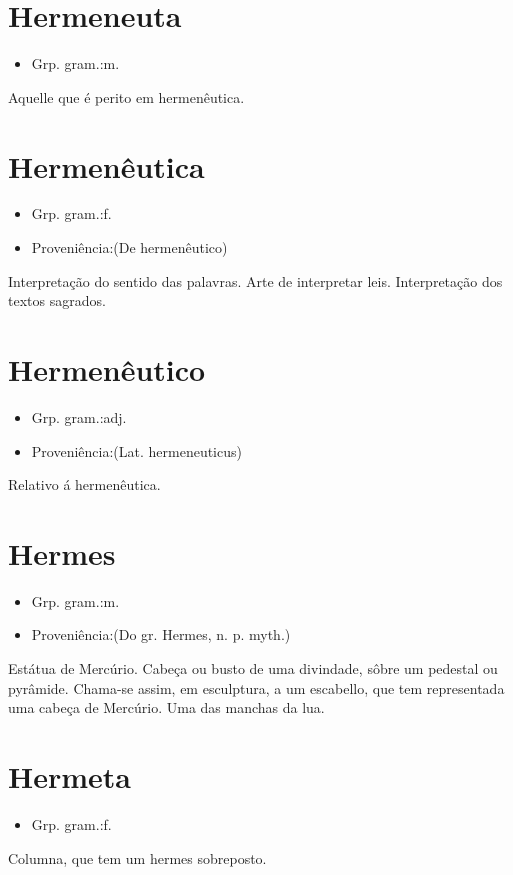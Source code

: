 \documentclass{article}
\begin{document}
\section{Hermeneuta}
\begin{itemize}
\item {Grp. gram.:m.}
\end{itemize}
Aquelle que é perito em hermenêutica.
\section{Hermenêutica}
\begin{itemize}
\item {Grp. gram.:f.}
\end{itemize}
\begin{itemize}
\item {Proveniência:(De \textunderscore hermenêutico\textunderscore )}
\end{itemize}
Interpretação do sentido das palavras.
Arte de interpretar leis.
Interpretação dos textos sagrados.
\section{Hermenêutico}
\begin{itemize}
\item {Grp. gram.:adj.}
\end{itemize}
\begin{itemize}
\item {Proveniência:(Lat. \textunderscore hermeneuticus\textunderscore )}
\end{itemize}
Relativo á hermenêutica.
\section{Hermes}
\begin{itemize}
\item {Grp. gram.:m.}
\end{itemize}
\begin{itemize}
\item {Proveniência:(Do gr. \textunderscore Hermes\textunderscore , n. p. myth.)}
\end{itemize}
Estátua de Mercúrio.
Cabeça ou busto de uma divindade, sôbre um pedestal ou pyrâmide.
Chama-se assim, em esculptura, a um escabello, que tem representada uma cabeça de Mercúrio.
Uma das manchas da lua.
\section{Hermeta}
\begin{itemize}
\item {Grp. gram.:f.}
\end{itemize}
Columna, que tem um hermes sobreposto.
\end{document}

